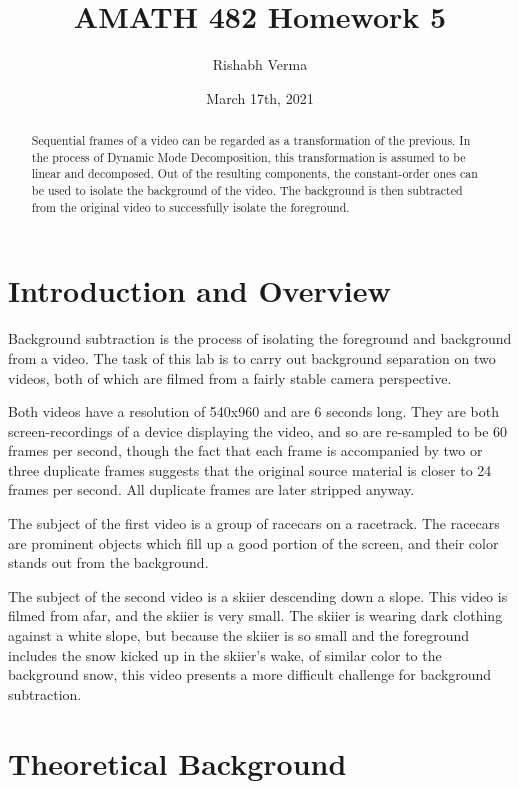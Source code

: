 \documentclass{article}
\title{AMATH 482 Homework 5}
\author{Rishabh Verma}
\date{March 17th, 2021}
\begin{document}
\maketitle

\begin{abstract}
	Sequential frames of a video can be regarded as a transformation of the previous. In the process of Dynamic Mode Decomposition, this transformation is assumed to be linear and decomposed. Out of the resulting components, the constant-order ones can be used to isolate the background of the video. The background is then subtracted from the original video to successfully isolate the foreground.
\end{abstract}

\section{Introduction and Overview}
Background subtraction is the process of isolating the foreground and background from a video. The task of this lab is to carry out background separation on two videos, both of which are filmed from a fairly stable camera perspective. 

Both videos have a resolution of 540x960 and are 6 seconds long. They are both screen-recordings of a device displaying the video, and so are re-sampled to be 60 frames per second, though the fact that each frame is accompanied by two or three duplicate frames suggests that the original source material is closer to 24 frames per second. All duplicate frames are later stripped anyway.

The subject of the first video is a group of racecars on a racetrack. The racecars are prominent objects which fill up a good portion of the screen, and their color stands out from the background. 

The subject of the second video is a skiier descending down a slope. This video is filmed from afar, and the skiier is very small. The skiier is wearing dark clothing against a white slope, but because the skiier is so small and the foreground includes the snow kicked up in the skiier's wake, of similar color to the background snow, this video presents a more difficult challenge for background subtraction.

\section{Theoretical Background}
\end{document}
